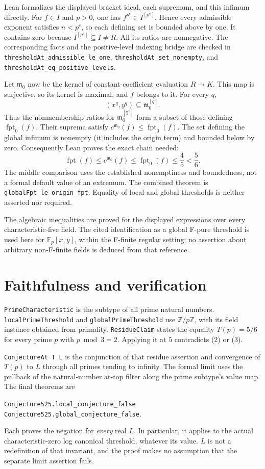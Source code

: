 \documentclass[11pt,a4paper]{article}
\newcommand{\lean}[1]{\nolinkurl{#1}}
\newcommand{\F}{\mathbb F}
\newcommand{\fpt}{\operatorname{fpt}}
\newcommand{\origin}{\mathfrak m_0}
\begin{document}
Lean formalizes the displayed bracket ideal, each supremum, and this
infimum directly. For $f\in I$ and $p>0$, one has
$f^{p^e}\in I^{[p^e]}$. Hence every admissible exponent satisfies
$n<p^e$, so each defining set is bounded above by one. It contains zero
because $I^{[p^e]}\subseteq I\ne R$. All its ratios are nonnegative.
The corresponding facts and the positive-level indexing bridge are
checked in \lean{thresholdAt_admissible_le_one},
\lean{thresholdAt_set_nonempty}, and
\lean{thresholdAt_eq_positive_levels}.

Let $\origin$ now be the kernel of constant-coefficient evaluation
$R\to K$. This map is surjective, so its kernel is maximal, and $f$
belongs to it. For every $q$,
\[
 (x^q,y^q)\subseteq\origin^{[q]}.
\]
Thus the nonmembership ratios for $\origin^{[5^e]}$ form a subset of
those defining $\fpt_0(f)$. Their suprema satisfy
$c^{\origin}(f)\le\fpt_0(f)$. The set defining the global infimum is
nonempty (it includes the origin term) and bounded below by zero.
Consequently Lean proves the exact chain needed:
\[
 \fpt(f)\le c^{\origin}(f)\le\fpt_0(f)\le\frac45<\frac56.
 \tag{3}
\]
The middle comparison uses the established nonemptiness and boundedness,
not a formal default value of an extremum. The combined theorem is
\lean{globalFpt_le_origin_fpt}. Equality of local and global thresholds
is neither asserted nor required.

The algebraic inequalities are proved for the displayed expressions over
every characteristic-five field. The cited identification as a global
F-pure threshold is used here for $\F_p[x,y]$, within the F-finite
regular setting; no assertion about arbitrary non-F-finite fields is
deduced from that reference.

\newpage
\section{Faithfulness and verification}
\lean{PrimeCharacteristic} is the subtype of all prime natural numbers.
\lean{localPrimeThreshold} and \lean{globalPrimeThreshold} use
$\mathbb Z/p\mathbb Z$, with its field instance obtained from primality.
\lean{ResidueClaim} states the equality $T(p)=5/6$ for every prime
$p$ with $p\bmod3=2$. Applying it at $5$ contradicts (2) or (3).

\lean{ConjectureAt T L} is the conjunction of that residue assertion
and convergence of $T(p)$ to $L$ through all primes tending to infinity.
The formal limit uses the pullback of the natural-number at-top filter
along the prime subtype's value map. The final theorems are
\begin{center}
\lean{Conjecture525.local_conjecture_false}\\[3pt]
\lean{Conjecture525.global_conjecture_false}.
\end{center}
Each proves the negation for \emph{every} real $L$. In particular, it
applies to the actual characteristic-zero log canonical threshold,
whatever its value. $L$ is not a redefinition of that invariant, and the
proof makes no assumption that the separate limit assertion fails.
\end{document}
